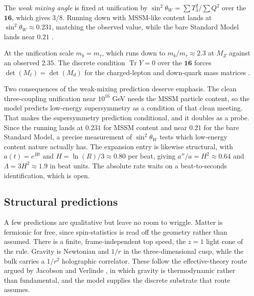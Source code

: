 \begin{result}
The \emph{weak mixing angle} is fixed at unification by $\sin^2\theta_W = \sum T_3^2 / \sum Q^2$ over the $\mathbf{16}$, which gives $3/8$. Running down with MSSM-like content lands at $\sin^2\theta_W \approx 0.231$, matching the observed value, while the bare Standard Model lands near $0.21$ \cite{pollard2026vibetest}.
\end{result}

\begin{proposition}
At the unification scale $m_b = m_\tau$, which runs down to $m_b/m_\tau \approx 2.3$ at $M_Z$ against an observed $2.35$. The discrete condition $\operatorname{Tr} Y = 0$ over the $\mathbf{16}$ forces $\det(M_{\ell}) = \det(M_d)$ for the charged-lepton and down-quark mass matrices \cite{pollard2026vibetest}.
\end{proposition}

Two consequences of the weak-mixing prediction deserve emphasis. The clean three-coupling unification near $10^{16}$ GeV needs the MSSM particle content, so the model predicts low-energy supersymmetry as a condition of that clean meeting. That makes the supersymmetry prediction conditional, and it doubles as a probe. Since the running lands at $0.231$ for MSSM content and near $0.21$ for the bare Standard Model, a precise measurement of $\sin^2\theta_W$ tests which low-energy content nature actually has. The expansion entry is likewise structural, with $a(t) = e^{Ht}$ and $H = \ln(R)/3 \approx 0.80$ per beat, giving $a''/a = H^2 \approx 0.64$ and $\Lambda = 3H^2 \approx 1.9$ in beat units. The absolute rate waits on a beat-to-seconds identification, which is open.

\subsection{Structural predictions}

A few predictions are qualitative but leave no room to wriggle. Matter is fermionic for free, since spin-statistics is read off the geometry rather than assumed. There is a finite, frame-independent top speed, the $z = 1$ light cone of the rule. Gravity is Newtonian and $1/r$ in the three-dimensional cusp, while the bulk carries a $1/r^2$ holographic correlator. These follow the effective-theory route argued by Jacobson \cite{jacobson1995} and Verlinde \cite{verlinde2011}, in which gravity is thermodynamic rather than fundamental, and the model supplies the discrete substrate that route assumes.

